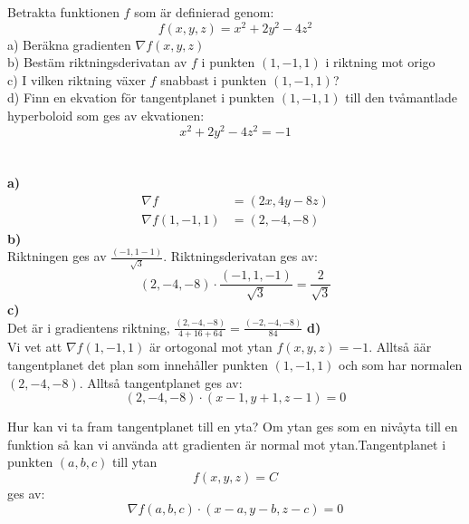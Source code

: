 \documentclass{report}
\begin{document}
{
Betrakta funktionen $ f $ som är definierad genom:
\begin{equation*}
f(x,y,z) = x^2+2y^2-4z^2
\end{equation*}
a) Beräkna gradienten $ \nabla f(x,y,z) $\\
b) Bestäm riktningsderivatan av $ f $ i punkten $ (1,-1,1) $ i riktning mot origo\\
c) I vilken riktning växer $ f $ snabbast i punkten $ (1,-1,1) $?\\
d) Finn en ekvation för tangentplanet i punkten $ (1,-1,1) $ till den tvåmantlade hyperboloid som ges av ekvationen:
\begin{equation*}
x^2+2y^2-4z^2 =-1
\end{equation*}\\\\

\textbf{a)}\\
\begin{align*}
	\nabla f &= (2x,4y-8z)\\
	\nabla f(1,-1,1) &= (2,-4,-8)
\end{align*}
\textbf{b)}\\
Riktningen ges av $ \frac{(-1,1-1)}{ \sqrt{3} }  $. Riktningsderivatan ges av:
\begin{equation*}
	(2,-4,-8) \cdot \frac{(-1,1,-1)}{ \sqrt{3} } = \frac{2}{ \sqrt{3} } 
\end{equation*}
\textbf{c)}\\
Det är i gradientens riktning, $ \frac{(2,-4,-8)}{4+16+64} = \frac{(-2,-4,-8)}{84}   $ 
\textbf{d)}\\
Vi vet att $ \nabla f(1,-1,1) $ är ortogonal mot ytan $ f(x,y,z) = -1 $. Alltså äär tangentplanet det plan som innehåller punkten $ (1,-1,1) $ och som har normalen $ (2,-4,-8) $. Alltså tangentplanet ges av:
\begin{equation*}
	(2,-4,-8) \cdot (x-1,y+1,z-1) = 0
\end{equation*}
}

{
Hur kan vi ta fram tangentplanet till en yta? Om ytan ges som en nivåyta till en funktion så kan vi använda att gradienten är normal mot ytan.Tangentplanet i punkten $ (a,b,c) $ till ytan
\begin{equation*}
f(x,y,z) = C
\end{equation*}
ges av:
\begin{equation*}
\nabla f(a,b,c) \cdot (x-a,y-b,z-c) = 0
\end{equation*}
}
\end{document}
